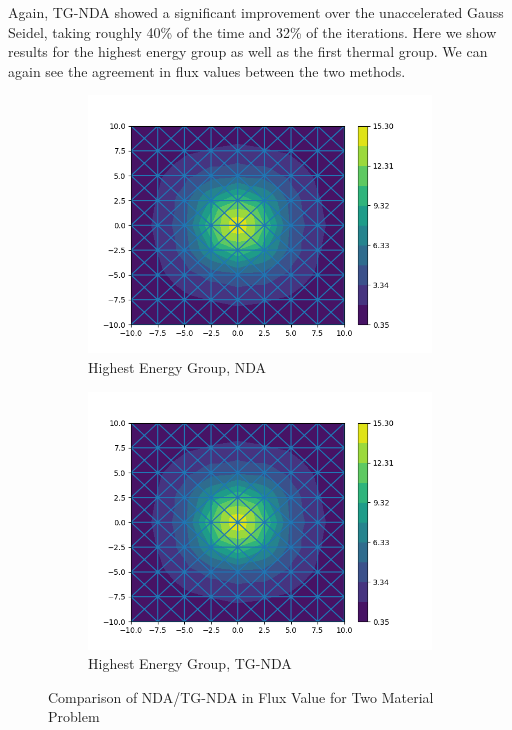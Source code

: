 Again, TG-NDA showed a significant improvement over the unaccelerated Gauss Seidel, taking roughly 40\% of the time and 32\% of the iterations. Here we show results for the highest energy group as well as the first thermal group. We can again see the agreement in flux values between the two methods. 
\begin{figure}[H]
\centering
\begin{subfigure}{.5\textwidth}
  \centering
  \includegraphics[width=\linewidth]{fig/nda_iron-water_scalar_flux_group0.png}
  \caption{Highest Energy Group, NDA}
  \label{fig:NDA-Mod}
\end{subfigure}%
\begin{subfigure}{.5\textwidth}
  \centering
  \includegraphics[width=\linewidth]{fig/tgnda_iron-water_scalar_flux_group0.png}
  \caption{Highest Energy Group, TG-NDA}
  \label{fig:TG-NDA-Mod}
\end{subfigure}
\caption{Comparison of NDA/TG-NDA in Flux Value for Two Material Problem}
\label{fig:Moderator}
\end{figure}


